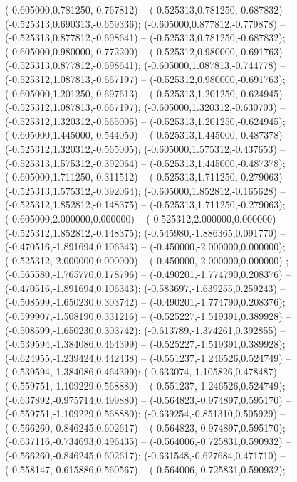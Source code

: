  (-0.605000,0.781250,-0.767812) -- (-0.525313,0.781250,-0.687832) -- (-0.525313,0.690313,-0.659336);
 (-0.605000,0.877812,-0.779878) -- (-0.525313,0.877812,-0.698641) -- (-0.525313,0.781250,-0.687832);
 (-0.605000,0.980000,-0.772200) -- (-0.525312,0.980000,-0.691763) -- (-0.525313,0.877812,-0.698641);
 (-0.605000,1.087813,-0.744778) -- (-0.525312,1.087813,-0.667197) -- (-0.525312,0.980000,-0.691763);
 (-0.605000,1.201250,-0.697613) -- (-0.525313,1.201250,-0.624945) -- (-0.525312,1.087813,-0.667197);
 (-0.605000,1.320312,-0.630703) -- (-0.525312,1.320312,-0.565005) -- (-0.525313,1.201250,-0.624945);
 (-0.605000,1.445000,-0.544050) -- (-0.525313,1.445000,-0.487378) -- (-0.525312,1.320312,-0.565005);
 (-0.605000,1.575312,-0.437653) -- (-0.525313,1.575312,-0.392064) -- (-0.525313,1.445000,-0.487378);
 (-0.605000,1.711250,-0.311512) -- (-0.525313,1.711250,-0.279063) -- (-0.525313,1.575312,-0.392064);
 (-0.605000,1.852812,-0.165628) -- (-0.525312,1.852812,-0.148375) -- (-0.525313,1.711250,-0.279063);
 (-0.605000,2.000000,0.000000) -- (-0.525312,2.000000,0.000000) -- (-0.525312,1.852812,-0.148375);
 (-0.545980,-1.886365,0.091770) -- (-0.470516,-1.891694,0.106343) -- (-0.450000,-2.000000,0.000000);
 (-0.525312,-2.000000,0.000000) -- (-0.450000,-2.000000,0.000000) ;
 (-0.565580,-1.765770,0.178796) -- (-0.490201,-1.774790,0.208376) -- (-0.470516,-1.891694,0.106343);
 (-0.583697,-1.639255,0.259243) -- (-0.508599,-1.650230,0.303742) -- (-0.490201,-1.774790,0.208376);
 (-0.599907,-1.508190,0.331216) -- (-0.525227,-1.519391,0.389928) -- (-0.508599,-1.650230,0.303742);
 (-0.613789,-1.374261,0.392855) -- (-0.539594,-1.384086,0.464399) -- (-0.525227,-1.519391,0.389928);
 (-0.624955,-1.239424,0.442438) -- (-0.551237,-1.246526,0.524749) -- (-0.539594,-1.384086,0.464399);
 (-0.633074,-1.105826,0.478487) -- (-0.559751,-1.109229,0.568880) -- (-0.551237,-1.246526,0.524749);
 (-0.637892,-0.975714,0.499880) -- (-0.564823,-0.974897,0.595170) -- (-0.559751,-1.109229,0.568880);
 (-0.639254,-0.851310,0.505929) -- (-0.566260,-0.846245,0.602617) -- (-0.564823,-0.974897,0.595170);
 (-0.637116,-0.734693,0.496435) -- (-0.564006,-0.725831,0.590932) -- (-0.566260,-0.846245,0.602617);
 (-0.631548,-0.627684,0.471710) -- (-0.558147,-0.615886,0.560567) -- (-0.564006,-0.725831,0.590932);
